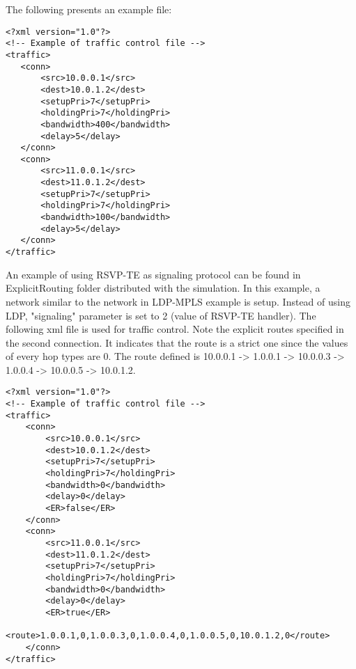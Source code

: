 The following presents an example file:

\begin{verbatim}
<?xml version="1.0"?>
<!-- Example of traffic control file -->
<traffic>
   <conn>
       <src>10.0.0.1</src>
       <dest>10.0.1.2</dest>
       <setupPri>7</setupPri>
       <holdingPri>7</holdingPri>
       <bandwidth>400</bandwidth>
       <delay>5</delay>
   </conn>
   <conn>
       <src>11.0.0.1</src>
       <dest>11.0.1.2</dest>
       <setupPri>7</setupPri>
       <holdingPri>7</holdingPri>
       <bandwidth>100</bandwidth>
       <delay>5</delay>
   </conn>
</traffic>
\end{verbatim}

An example of using RSVP-TE as signaling protocol can be found in
ExplicitRouting folder distributed with the simulation. In this
example, a network similar to the network in LDP-MPLS example is
setup. Instead of using LDP, "signaling" parameter is set to 2 (value
of RSVP-TE handler). The following xml file is used for traffic
control. Note the explicit routes specified in the second connection.
It indicates that the route is a strict one since the values of every
hop types are 0. The route defined is 10.0.0.1 -> 1.0.0.1 ->
10.0.0.3 -> 1.0.0.4 -> 10.0.0.5 -> 10.0.1.2.

\begin{verbatim}
<?xml version="1.0"?>
<!-- Example of traffic control file -->
<traffic>
    <conn>
        <src>10.0.0.1</src>
        <dest>10.0.1.2</dest>
        <setupPri>7</setupPri>
        <holdingPri>7</holdingPri>
        <bandwidth>0</bandwidth>
        <delay>0</delay>
        <ER>false</ER>
    </conn>
    <conn>
        <src>11.0.0.1</src>
        <dest>11.0.1.2</dest>
        <setupPri>7</setupPri>
        <holdingPri>7</holdingPri>
        <bandwidth>0</bandwidth>
        <delay>0</delay>
        <ER>true</ER>
        <route>1.0.0.1,0,1.0.0.3,0,1.0.0.4,0,1.0.0.5,0,10.0.1.2,0</route>
    </conn>
</traffic>
\end{verbatim}



